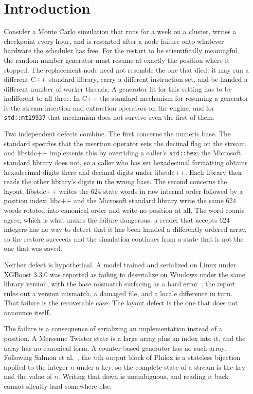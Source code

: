 \documentclass[acmsmall,screen,review]{acmart}
\theoremstyle{acmdefinition}
\newcommand{\code}[1]{\texttt{#1}}
\begin{document}
\section{Introduction}\label{sec:intro}

Consider a Monte Carlo simulation that runs for a week on a
cluster, writes a checkpoint every hour, and is restarted after a node failure
onto whatever hardware the scheduler has free. For the restart to be
scientifically meaningful, the random number generator must resume at exactly
the position where it stopped. The replacement node need not resemble the one
that died: it may run a different C++ standard library, carry a different
instruction set, and be handed a different number of worker threads. A
generator fit for this setting has to be indifferent to all three. In C++ the
standard mechanism for resuming a generator is the stream insertion and
extraction operators on the engine, and for \code{std::mt19937} that mechanism
does not survive even the first of them.

Two independent defects combine. The first concerns the numeric base. The
standard specifies that the insertion operator sets the decimal flag on the
stream, and libstdc++ implements this by overriding a caller's \code{std::hex};
the Microsoft standard library does not, so a caller who has set hexadecimal
formatting obtains hexadecimal digits there and decimal digits under libstdc++.
Each library then reads the other library's digits in the wrong base. The
second concerns the layout. libstdc++ writes the 624 state words in raw
internal order followed by a position index; libc++ and the Microsoft standard
library write the same 624 words rotated into canonical order and write no
position at all. The word counts agree, which is what makes the failure
dangerous: a reader that accepts 624 integers has no way to detect that it has
been handed a differently ordered array, so the restore succeeds and the
simulation continues from a state that is not the one that was saved.

Neither defect is hypothetical. A model trained and serialized on Linux under
XGBoost 3.3.0 was reported as failing to deserialize on Windows under the same
library version, with the base mismatch surfacing as a hard
error~\cite{xgboostbug}; the report rules out a version mismatch, a damaged
file, and a locale difference in turn. That failure is the recoverable case.
The layout defect is the one that does not announce itself.

The failure is a consequence of serializing an implementation instead of a
position. A Mersenne Twister state is a large array plus an index into it, and
the array has no canonical form. A counter-based generator has no such array.
Following Salmon et al.~\cite{salmon2011}, the $n$th output block of Philox is
a stateless bijection applied to the integer $n$ under a key, so the complete
state of a stream is the key and the value of $n$. Writing that down is
unambiguous, and reading it back cannot silently land somewhere else.
\end{document}
